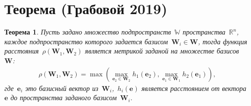 \documentclass[12pt, twoside]{article}
\newtheorem{theorem}{Теорема}
\numberwithin{equation}{section}
\begin{document}
\section{Теорема (Грабовой 2019)}\label{ProofTheorem1}
\begin{theorem}\label{th:1} 
Пусть задано множество подпространств~$\mathbb{W}$ пространства~$\mathbb{R}^{n}$, каждое подпространство которого задается базисом~$\mathbf{W}_i\in \mathbf{W}$, тогда функция расстояния~$\rho\left(\textbf{W}_1, \textbf{W}_2\right)$ является метрикой заданой на множестве базисов~$\mathbf{W}$:
\begin{equation}
\label{eq:th2:1}
\begin{aligned}
\rho\left(\textbf{W}_1, \textbf{W}_2\right) = \max\left(\max_{\textbf{e}_2 \in \textbf{W}_2} h_{1}\left(\textbf{e}_2\right), \max_{\textbf{e}_1 \in \textbf{W}_1} h_{2}\left(\textbf{e}_1\right)\right),
\end{aligned}
\end{equation}
где~$\textbf{e}_i$ это базисный вектор из~$\textbf{W}_i$,~$h_i\left(\textbf{e}\right)$ является расстоянием от вектора~$\textbf{e}$ до пространства заданого базисом~$\textbf{W}_i$.
\end{theorem}
\end{document}
